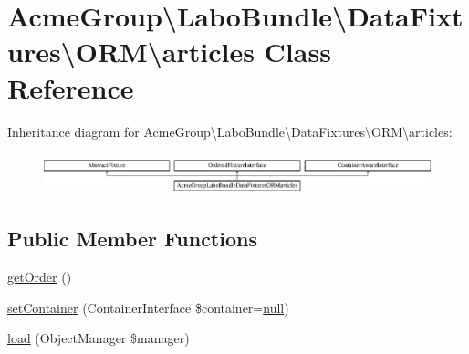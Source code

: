 \hypertarget{class_acme_group_1_1_labo_bundle_1_1_data_fixtures_1_1_o_r_m_1_1articles}{\section{Acme\+Group\textbackslash{}Labo\+Bundle\textbackslash{}Data\+Fixtures\textbackslash{}O\+R\+M\textbackslash{}articles Class Reference}
\label{class_acme_group_1_1_labo_bundle_1_1_data_fixtures_1_1_o_r_m_1_1articles}
}
Inheritance diagram for Acme\+Group\textbackslash{}Labo\+Bundle\textbackslash{}Data\+Fixtures\textbackslash{}O\+R\+M\textbackslash{}articles\+:\begin{figure}[H]
\begin{center}
\leavevmode
\includegraphics[height=1.200429cm]{class_acme_group_1_1_labo_bundle_1_1_data_fixtures_1_1_o_r_m_1_1articles}
\end{center}
\end{figure}
\subsection*{Public Member Functions}
\begin{DoxyCompactItemize}
\item 
\hyperlink{class_acme_group_1_1_labo_bundle_1_1_data_fixtures_1_1_o_r_m_1_1articles_a1344fd89885b59c5d80d3b82b0833b85}{get\+Order} ()
\item 
\hyperlink{class_acme_group_1_1_labo_bundle_1_1_data_fixtures_1_1_o_r_m_1_1articles_a43c5ba19b57997f6280ab13da182c29c}{set\+Container} (Container\+Interface \$container=\hyperlink{validate_8js_afb8e110345c45e74478894341ab6b28e}{null})
\item 
\hyperlink{class_acme_group_1_1_labo_bundle_1_1_data_fixtures_1_1_o_r_m_1_1articles_a6d1d95720eda421a4dd390555e6b4379}{load} (Object\+Manager \$manager)
\end{DoxyCompactItemize}


